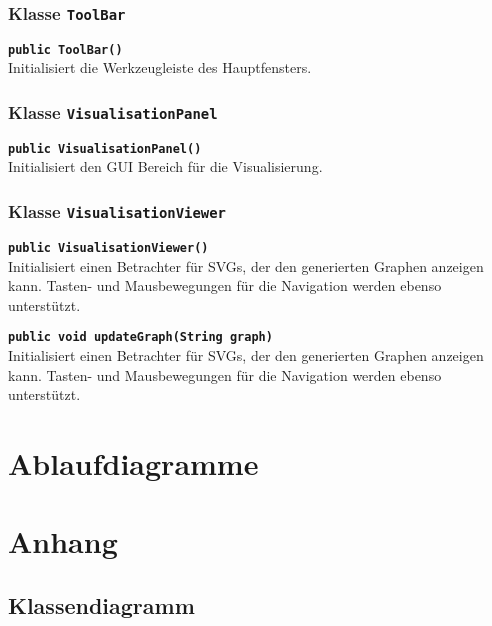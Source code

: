 \documentclass[parskip=full,11pt,twoside]{scrartcl}
\begin{document}
\subsubsection{Klasse \texttt{ToolBar}}

\textbf{\texttt{public ToolBar()}}\\
Initialisiert die Werkzeugleiste des Hauptfensters.

\subsubsection{Klasse \texttt{VisualisationPanel}}

\textbf{\texttt{public VisualisationPanel()}}\\
Initialisiert den GUI Bereich für die Visualisierung.

\subsubsection{Klasse \texttt{VisualisationViewer}}

\textbf{\texttt{public VisualisationViewer()}}\\
Initialisiert einen Betrachter für SVGs, der den generierten Graphen anzeigen kann. Tasten- und Mausbewegungen für die Navigation werden ebenso unterstützt.

\textbf{\texttt{public void updateGraph(String graph)}}\\
Initialisiert einen Betrachter für SVGs, der den generierten Graphen anzeigen kann. Tasten- und Mausbewegungen für die Navigation werden ebenso unterstützt.

\section{Ablaufdiagramme}

\appendix

\section{Anhang}

\subsection{Klassendiagramm}
\end{document}
